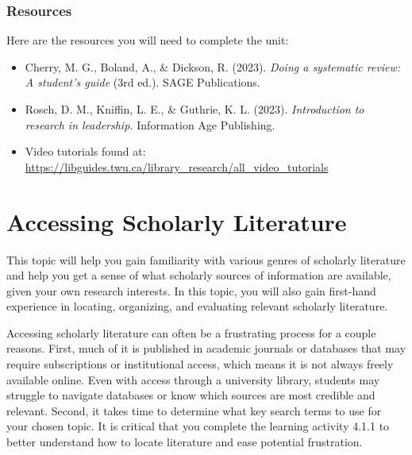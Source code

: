 \documentclass[
  letterpaper,
  DIV=11,
  numbers=noendperiod]{scrreprt}
\providecommand{\tightlist}{%
  \setlength{\itemsep}{0pt}\setlength{\parskip}{0pt}}\usepackage{longtable,booktabs,array}
\begin{document}
\subsection*{Resources}\label{resources-3}

Here are the resources you will need to complete the unit:

\begin{itemize}
\tightlist
\item
  Cherry, M. G., Boland, A., \& Dickson, R. (2023). \emph{Doing a
  systematic review: A student's guide} (3rd ed.). SAGE Publications.
\item
  Rosch, D. M., Kniffin, L. E., \& Guthrie, K. L. (2023).
  \emph{Introduction to research in leadership.} Information Age
  Publishing.
\item
  Video tutorials found at:
  \url{https://libguides.twu.ca/library_research/all_video_tutorials}
\end{itemize}


\chapter*{}\label{section-4}

\markboth{}{}


\chapter*{Accessing Scholarly
Literature}\label{accessing-scholarly-literature}


This topic will help you gain familiarity with various genres of
scholarly literature and help you get a sense of what scholarly sources
of information are available, given your own research interests. In this
topic, you will also gain first-hand experience in locating, organizing,
and evaluating relevant scholarly literature.

Accessing scholarly literature can often be a frustrating process for a
couple reasons. First, much of it is published in academic journals or
databases that may require subscriptions or institutional access, which
means it is not always freely available online. Even with access through
a university library, students may struggle to navigate databases or
know which sources are most credible and relevant. Second, it takes time
to determine what key search terms to use for your chosen topic. It is
critical that you complete the learning activity 4.1.1 to better
understand how to locate literature and ease potential frustration.
\end{document}
